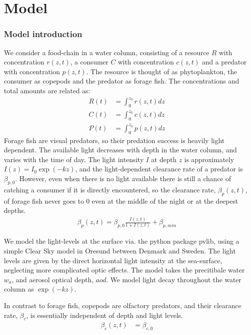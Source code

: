 
\section{Model}

\subsubsection*{Model introduction}
We consider a food-chain in a water column, consisting of a resource $R$ with concentration $r(z,t)$, a consumer $C$ with concentration $c(z,t)$ and a predator with concentration $p(z,t)$. The resource is thought of as phytoplankton, the consumer as copepods and the predator as forage fish. The concentrations and total amounts are related as:
\begin{align*}
        R(t) &= \int_0^{z_0} r(z,t) dz \\
	      C(t) &= \int_0^{z_0} c(z,t) dz \\
	      P(t) &= \int_0^{z_0} p(z,t) dz
\end{align*}
Forage fish are visual predators, so their predation success is heavily light dependent. The available light decreases with depth in the water column, and varies with the time of day.
The light intensity $I$ at depth $z$ is approximately $I(z) = I_0\exp(-kz)$, and the light-dependent clearance rate of a predator is $\beta_{p,0}$.  However, even when there is no light available there is still a chance of catching a consumer if it is directly encountered,  so the clearance rate, $\beta_p(z,t)$, of forage fish never goes to 0 even at the middle of the night or at the deepest depths.
\begin{align*}
  \beta_p(z,t) = \beta_{p,0} \frac{I(z,t)}{1+I(z,t)} + \beta_{p,min}
\end{align*}


We model the light-levels at the surface via. the python package pvlib, using a simple Clear Sky model in Oresund between Denmark and Sweden. The light levels are given by the direct horizontal light intensity at the sea-surface, neglecting more complicated optic effects. The model takes the precitibale water $w_a$, and aerosol optical depth, $aod$. We model light decay throughout the water column as $\exp(-kz)$.


In contrast to forage fish, copepods are olfactory predators, and their clearance rate, $\beta_c$, is essentially independent of depth and light levels.
\begin{align*}
	\beta_c(z,t) &=  \beta_{c,0}
\end{align*}


